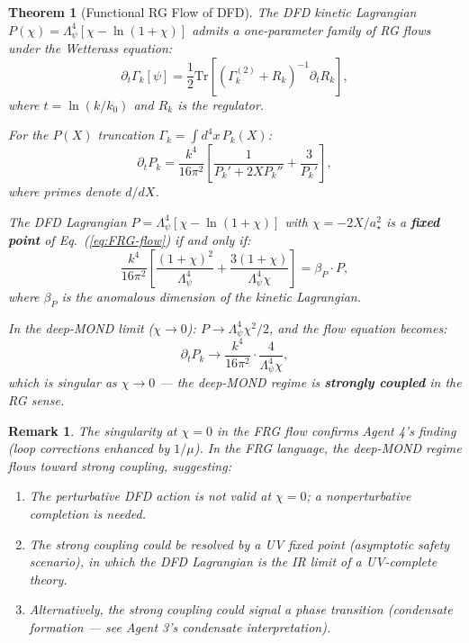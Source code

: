 \documentclass[11pt,a4paper]{article}
\newtheorem{theorem}{Theorem}
\newtheorem{remark}{Remark}
\begin{document}
\begin{theorem}[Functional RG Flow of DFD]
\label{thm:FRG}
The DFD kinetic Lagrangian $P(\chi) = \Lambda_\psi^4[\chi - \ln(1+\chi)]$ admits a one-parameter family of RG flows under the Wetterass equation:
\begin{equation}
\partial_t \Gamma_k[\psi] = \frac{1}{2}\text{Tr}\left[\left(\Gamma_k^{(2)} + R_k\right)^{-1}\partial_t R_k\right],
\end{equation}
where $t = \ln(k/k_0)$ and $R_k$ is the regulator.

For the $P(X)$ truncation $\Gamma_k = \int d^4x\,P_k(X)$:
\begin{equation}\label{eq:FRG-flow}
\partial_t P_k = \frac{k^4}{16\pi^2}\left[\frac{1}{P_k' + 2X P_k''} + \frac{3}{P_k'}\right],
\end{equation}
where primes denote $d/dX$.

The DFD Lagrangian $P = \Lambda_\psi^4[\chi - \ln(1+\chi)]$ with $\chi = -2X/a_\star^2$ is a \textbf{fixed point} of Eq.~(\ref{eq:FRG-flow}) if and only if:
\begin{equation}
\frac{k^4}{16\pi^2}\left[\frac{(1+\chi)^2}{\Lambda_\psi^4} + \frac{3(1+\chi)}{\Lambda_\psi^4\chi}\right] = \beta_P \cdot P,
\end{equation}
where $\beta_P$ is the anomalous dimension of the kinetic Lagrangian.

In the deep-MOND limit ($\chi \to 0$): $P \to \Lambda_\psi^4\chi^2/2$, and the flow equation becomes:
\begin{equation}
\partial_t P_k \to \frac{k^4}{16\pi^2}\cdot\frac{4}{\Lambda_\psi^4\chi},
\end{equation}
which is singular as $\chi \to 0$ --- the deep-MOND regime is \textbf{strongly coupled} in the RG sense.
\end{theorem}

\begin{remark}
The singularity at $\chi = 0$ in the FRG flow confirms Agent 4's finding (loop corrections enhanced by $1/\mu$). In the FRG language, the deep-MOND regime flows toward strong coupling, suggesting:
\begin{enumerate}
\item The perturbative DFD action is not valid at $\chi = 0$; a nonperturbative completion is needed.
\item The strong coupling could be resolved by a UV fixed point (asymptotic safety scenario), in which the DFD Lagrangian is the IR limit of a UV-complete theory.
\item Alternatively, the strong coupling could signal a phase transition (condensate formation --- see Agent 3's condensate interpretation).
\end{enumerate}
\end{remark}
\end{document}
